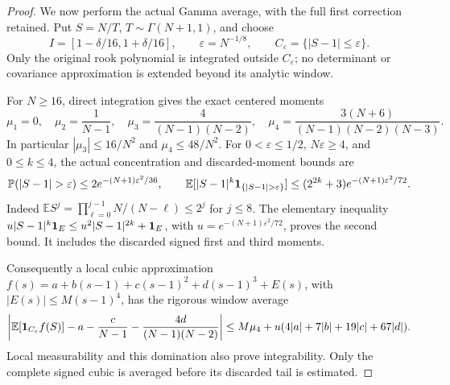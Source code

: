\begin{proof}
We now perform the actual Gamma average, with the full first correction
retained. Put \(S=N/T\), \(T\sim\Gamma(N+1,1)\), and choose
\[
 I=[1-\delta/16,1+\delta/16],\qquad
 \varepsilon=N^{-1/8},\qquad
 C_\varepsilon=\{|S-1|\le\varepsilon\}.
\]
Only the original rook polynomial is integrated outside
\(C_\varepsilon\); no determinant or covariance approximation is extended
beyond its analytic window.

For \(N\ge16\), direct integration gives the exact centered moments
\[
 \mu_1=0,\quad \mu_2=\frac1{N-1},\quad
 \mu_3=\frac4{(N-1)(N-2)},\quad
 \mu_4=\frac{3(N+6)}{(N-1)(N-2)(N-3)}.
\]
In particular \(|\mu_3|\le16/N^2\) and \(\mu_4\le48/N^2\).
For \(0<\varepsilon\le1/2\), \(N\varepsilon\ge4\), and
\(0\le k\le4\), the actual concentration and discarded-moment bounds are
\[
 \mathbb P(|S-1|>\varepsilon)
       \le2e^{-(N+1)\varepsilon^2/36},\qquad
 \mathbb E[|S-1|^k\one_{\{|S-1|>\varepsilon\}}]
       \le(2^{2k}+3)e^{-(N+1)\varepsilon^2/72}.
\]
Indeed \(\mathbb E S^j=\prod_{\ell=0}^{j-1}N/(N-\ell)\le2^j\)
for \(j\le8\). The elementary inequality
\(u|S-1|^k\mathbf1_E\le u^2|S-1|^{2k}+\mathbf1_E\), with
\(u=e^{-(N+1)\varepsilon^2/72}\), proves the second bound.
It includes the discarded signed first and third moments.

Consequently a local cubic approximation
\(f(s)=a+b(s-1)+c(s-1)^2+d(s-1)^3+E(s)\), with
\(|E(s)|\le M(s-1)^4\), has the rigorous window average
\[
 \left|\mathbb E[\mathbf1_{C_\varepsilon}f(S)]
     -a-\frac c{N-1}-\frac{4d}{(N-1)(N-2)}\right|
 \le M\mu_4+
 u(4|a|+7|b|+19|c|+67|d|).
\]
Local measurability and this domination also prove integrability.
Only the complete signed cubic is averaged before its discarded tail
is estimated.


\end{proof}
